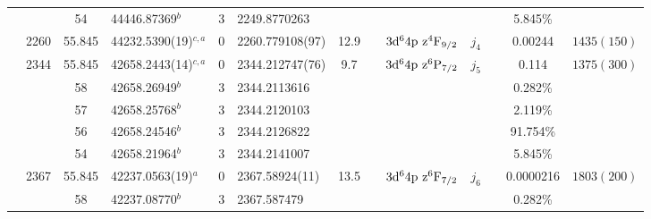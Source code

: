 \begin{table*}
\begin{center}
{\begin{tabular}{:l;l;c;l;c;l;c;l;l;c;c;c;c}
\rowstyle{\itshape}               &        & 54        & 44446.87369$^{b}$                & 3 &  2249.8770263      &      & $                                        $ & $                                        $ & $      $ &              & 5.845\%   & $          $\\
                                  & 2260   & 55.845    & 44232.5390(19)$^{c,a}$           & 0 &   2260.779108(97)  & 12.9 & $                                        $ & $3\rm{d}^64\rm{p~z}^4\rm{F}_{9/2}        $ & $j_{4} $ &              & 0.00244   & $ 1435(150)$\\
                                  & 2344   & 55.845    & 42658.2443(14)$^{c,a}$           & 0 &   2344.212747(76)  &  9.7 & $                                        $ & $3\rm{d}^64\rm{p~z}^6\rm{P}_{7/2}        $ & $j_{5} $ &              & 0.114     & $ 1375(300)$\\
\rowstyle{\itshape}               &        & 58        & 42658.26949$^{b}$                & 3 &  2344.2113616      &      & $                                        $ & $                                        $ & $      $ &              & 0.282\%   & $          $\\
\rowstyle{\itshape}               &        & 57        & 42658.25768$^{b}$                & 3 &  2344.2120103      &      & $                                        $ & $                                        $ & $      $ &              & 2.119\%   & $          $\\
\rowstyle{\itshape}               &        & 56        & 42658.24546$^{b}$                & 3 &  2344.2126822      &      & $                                        $ & $                                        $ & $      $ &              & 91.754\%  & $          $\\
\rowstyle{\itshape}               &        & 54        & 42658.21964$^{b}$                & 3 &  2344.2141007      &      & $                                        $ & $                                        $ & $      $ &              & 5.845\%   & $          $\\
                                  & 2367   & 55.845    & 42237.0563(19)$^{a}$             & 0 &    2367.58924(11)  & 13.5 & $                                        $ & $3\rm{d}^64\rm{p~z}^6\rm{F}_{7/2}        $ & $j_{6} $ &              & 0.0000216 & $ 1803(200)$\\
\rowstyle{\itshape}               &        & 58        & 42237.08770$^{b}$                & 3 &   2367.587479      &      & $                                        $ & $                                        $ & $      $ &              & 0.282\%   & $          $\\

\end{tabular}}
\end{center}
\end{table*}

